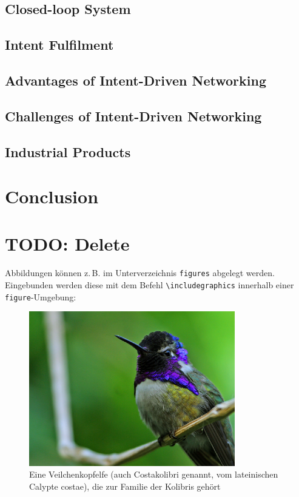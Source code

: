 \subsection{Closed-loop System}

\subsection{Intent Fulfilment}

\subsection{Advantages of Intent-Driven Networking}

\subsection{Challenges of Intent-Driven Networking}

\subsection{Industrial Products}

\section{Conclusion}
\label{sec:Conclusion}





\section{TODO: Delete}
\label{sec:Delete}
Abbildungen können z.\,B. im Unterverzeichnis \texttt{figures} abgelegt werden.
Eingebunden werden diese mit dem Befehl \texttt{\textbackslash includegraphics} innerhalb
einer \texttt{figure}-Umgebung:
\begin{figure}[htb]
  \centering
  \includegraphics[width=0.8\textwidth]{figures/Hummingbird.jpg}
  \caption{Eine Veilchenkopfelfe (auch Costakolibri genannt, vom lateinischen Calypte costae), die zur Familie der Kolibris gehört }
  \label{fig:kolibri}
\end{figure}

